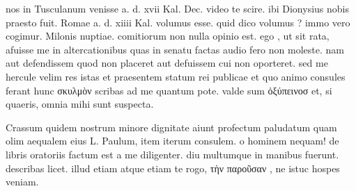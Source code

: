 


 nos in Tusculanum venisse a. d. xvii Kal. Dec. video te scire. ibi Dionysius nobis praesto fuit. Romae a. d. xiiii Kal. volumus esse. quid dico volumus ? immo vero cogimur. Milonis nuptiae. comitiorum non nulla opinio est. ego , ut sit rata, afuisse me in altercationibus quas in senatu factas audio fero non moleste. nam aut defendissem quod non placeret aut defuissem cui non oporteret. sed me hercule velim res istas et praesentem statum rei publicae et quo animo consules ferant hunc σκυλμὸν scribas ad me quantum pote. valde sum ὀξύπεινοσ et, si quaeris, omnia mihi sunt suspecta.

 Crassum quidem nostrum minore dignitate aiunt profectum paludatum quam olim aequalem eius L. Paulum, item iterum consulem. o hominem nequam! de libris oratoriis factum est a me diligenter. diu multumque in manibus fuerunt. describas licet. illud etiam atque etiam te rogo, τὴν παροῦσαν , ne istuc hospes veniam.
